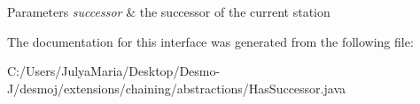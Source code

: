 \begin{DoxyParams}{Parameters}
{\em successor} & the successor of the current station \\
\hline
\end{DoxyParams}


The documentation for this interface was generated from the following file\-:\begin{DoxyCompactItemize}
\item 
C\-:/\-Users/\-Julya\-Maria/\-Desktop/\-Desmo-\/\-J/desmoj/extensions/chaining/abstractions/Has\-Successor.\-java\end{DoxyCompactItemize}
